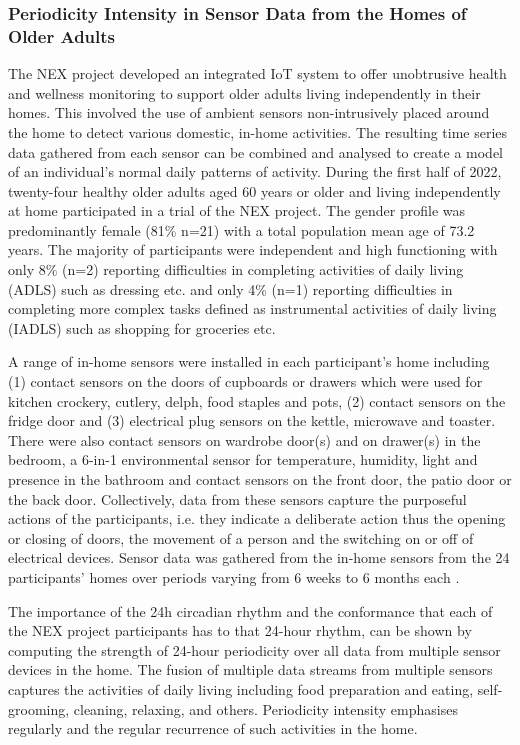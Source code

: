 \documentclass[preprints,article,accept,pdftex,moreauthors]{Definitions/mdpi}
\begin{document}
\subsubsection{Periodicity Intensity in Sensor Data from the Homes of Older Adults}

The NEX project \cite{info:doi/10.2196/35277}  developed an integrated IoT system to offer unobtrusive health and wellness monitoring to support older adults living independently in their home{s}.  This involved the use of ambient sensors  non-intrusively {placed} around  the home to detect various {domestic, in-home} activities. The resulting time series data gathered from each  sensor can  be combined and analysed to create a model of an individual’s normal daily patterns of activity. 
During the first half of 2022, twenty-four healthy older adults aged 60 years {or older} and  living independently at home participated in a trial of the NEX project. The gender profile was predominantly female (81\% n=21) with a total population mean age of 73.2 years.  The majority of participants were independent and high functioning with only 8\% (n=2) reporting difficulties in completing activities of daily living (ADLS)\cite{katz1963studies} such as dressing etc. and only 4\% (n=1) reporting difficulties in completing more complex tasks defined as instrumental activities of daily living (IADLS) \cite{lawton1988instrumental} such as shopping for groceries etc.

A range of in-home sensors were installed in each participant's home including {(1)} contact sensors on the doors of cupboards or drawers {which were} used for kitchen  crockery, cutlery, delph, food staples and pots, {(2)} contact sensors on the fridge door and {(3)} electrical plug sensors on the kettle, microwave and toaster. There were also contact sensors on wardrobe door(s) and on drawer(s) in the bedroom, a 6-in-1 environmental sensor for temperature, humidity, light and presence in the bathroom and contact sensors on the front door, the patio door or the back door.  
{Collectively, data from t}hese {sensors} capture  the purposeful actions of the participant{s}, i.e. they indicate a deliberate action  thus {the} opening or closing of doors,  {the movement of a} person  and  {the} switching on or off of electrical devices. 
Sensor data was gathered from the in-home sensors from the 24 participants' homes over periods varying from 6 weeks to 6 months each  \cite{info:doi/10.2196/35277}.

The importance of the 24h circadian rhythm and the conformance that each of the NEX project participants has to that 24-hour rhythm, can be shown by computing the strength of 24-hour periodicity over all  data  from multiple sensor devices in the home.  The fusion of multiple data streams from multiple sensors captures the activities of daily living including food preparation and eating, self-grooming, cleaning, relaxing, and others. Periodicity intensity emphasises regularly and the regular recurrence of such activities in the home.
\end{document}
